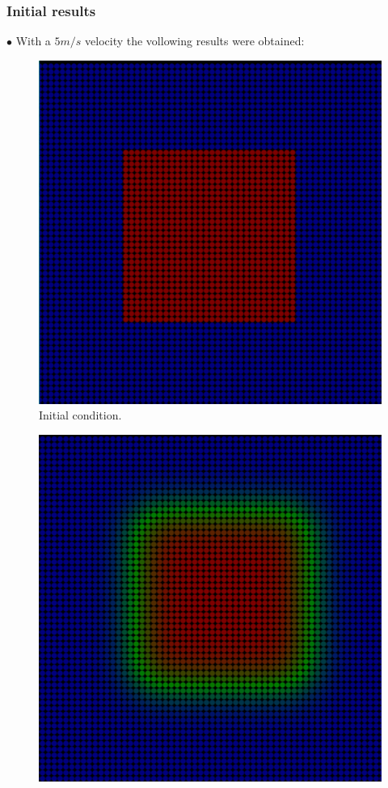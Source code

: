 \documentclass[xcolor=dvipsnames,10pt,aspectratio=169]{beamer}
\begin{document}
\begin{frame}
	\frametitle{Initial results}
	$\bullet$ With a $5 m/s$ velocity the vollowing results were obtained:\\
	\begin{minipage}[h!]{0.30\textwidth}
		\begin{figure}[h!]
			\centering
			\includegraphics[trim = {1cm 1cm 1cm 1cm}, clip , angle=0, scale=0.3]{figuras/sucesso_!}
			\caption{Initial condition.}
		\end{figure}
	\end{minipage}
	\begin{minipage}[h!]{0.30\textwidth}
		\begin{figure}[h!]
			\centering
			\includegraphics[trim = {1cm 1cm 1cm 1cm}, clip , angle=0, scale=0.3]{figuras/sucesso_velocidade_2}

\end{figure}
\end{minipage}
\end{frame}
\end{document}
